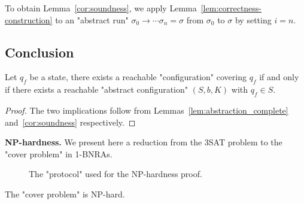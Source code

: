 To obtain Lemma~\ref{cor:soundness}, we apply Lemma~\ref{lem:correctness-construction} to an "abstract run" $\sigma_0 \to \cdots \sigma_n = \sigma$ from $\sigma_0$ to $\sigma$ by setting $i = n$.

\subsection{Conclusion}


\begin{proposition}
	\label{prop:sound-and-complete}
	Let $q_f$ be a state, there exists a reachable "configuration" covering $q_f$ if and only if there exists a reachable "abstract configuration" $(S,b,K)$ with $q_f \in S$.
\end{proposition}

\begin{proof}
	The two implications follow from Lemmas~\ref{lem:abstraction_complete} and~\ref{cor:soundness} respectively.
\end{proof}




\textbf{NP-hardness.} We present here a reduction from the 3SAT problem to the "cover problem" in 1-BNRAs.

\begin{figure}[h]
	
	\caption{The "protocol" used for the NP-hardness proof.}
	\label{fig:np-hard}
\end{figure}

\begin{proposition}
	\label{prop:np-hard-query-cover}
	The "cover problem" is NP-hard.
\end{proposition}

